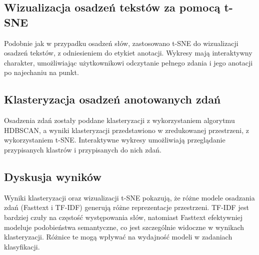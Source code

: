 \documentclass[12pt]{article}
\begin{document}
\subsection{Wizualizacja osadzeń tekstów za pomocą t-SNE}
Podobnie jak w przypadku osadzeń słów, zastosowano t-SNE do wizualizacji osadzeń tekstów, z odniesieniem do etykiet anotacji. Wykresy mają interaktywny charakter, umożliwiając użytkownikowi odczytanie pełnego zdania i jego anotacji po najechaniu na punkt.

\subsection{Klasteryzacja osadzeń anotowanych zdań}
Osadzenia zdań zostały poddane klasteryzacji z wykorzystaniem algorytmu HDBSCAN, a wyniki klasteryzacji przedstawiono w zredukowanej przestrzeni, z wykorzystaniem t-SNE. Interaktywne wykresy umożliwiają przeglądanie przypisanych klastrów i przypisanych do nich zdań.

\subsection{Dyskusja wyników}
Wyniki klasteryzacji oraz wizualizacji t-SNE pokazują, że różne modele osadzania zdań (Fasttext i TF-IDF) generują różne reprezentacje przestrzeni. TF-IDF jest bardziej czuły na częstość występowania słów, natomiast Fasttext efektywniej modeluje podobieństwa semantyczne, co jest szczególnie widoczne w wynikach klasteryzacji. Różnice te mogą wpływać na wydajność modeli w zadaniach klasyfikacji.
\end{document}

